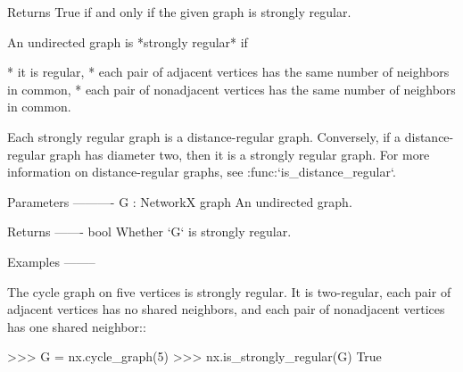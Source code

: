 \begin{DoxyVerb}Returns True if and only if the given graph is strongly
regular.

An undirected graph is *strongly regular* if

* it is regular,
* each pair of adjacent vertices has the same number of neighbors in
  common,
* each pair of nonadjacent vertices has the same number of neighbors
  in common.

Each strongly regular graph is a distance-regular graph.
Conversely, if a distance-regular graph has diameter two, then it is
a strongly regular graph. For more information on distance-regular
graphs, see :func:`is_distance_regular`.

Parameters
----------
G : NetworkX graph
    An undirected graph.

Returns
-------
bool
    Whether `G` is strongly regular.

Examples
--------

The cycle graph on five vertices is strongly regular. It is
two-regular, each pair of adjacent vertices has no shared neighbors,
and each pair of nonadjacent vertices has one shared neighbor::

    >>> G = nx.cycle_graph(5)
    >>> nx.is_strongly_regular(G)
    True\end{DoxyVerb}
 